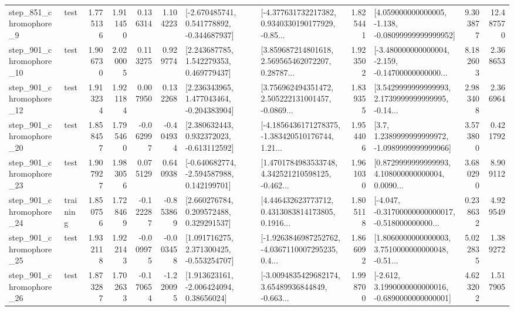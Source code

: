 \begin{tabular}{llrrrrllrlrr}
   step\_851\_chromophore\_9 &      test &      1.775136 &    1.911450 &      0.136314 &  1.104223 &   [-2.670485741, 0.541778892, -0.344687937] &  [-4.377631732217382, 0.9340330190177929, -0.85... &       1.825441 &  [4.059000000000005, -1.138, -0.08099999999999952] &            9.303877 &         12.487570 \\
  step\_901\_chromophore\_10 &      test &      1.906730 &    2.020005 &      0.113275 &  0.929774 &     [2.243687785, 1.542279353, 0.469779437] &  [3.859687214801618, 2.569565462072207, 0.28787... &       1.923502 &  [-3.480000000000004, -2.159, -0.14700000000000... &            8.182603 &          2.368653 \\
  step\_901\_chromophore\_12 &      test &      1.913234 &    1.921184 &      0.007950 &  0.132268 &    [2.236343965, 1.477043464, -0.204383904] &  [3.756962494351472, 2.505222131001457, -0.0869... &       1.839355 &  [3.5429999999999993, 2.1739999999999995, -0.14... &            2.983408 &          2.366964 \\
  step\_901\_chromophore\_20 &      test &      1.858457 &    1.795460 &     -0.062997 & -0.404934 &    [2.380632443, 0.932372023, -0.613112592] &  [-4.1856436171278375, -1.383420510176744, 1.21... &       1.954406 &     [3.7, 1.2389999999999972, -1.0989999999999966] &            3.573800 &          0.421792 \\
  step\_901\_chromophore\_23 &      test &      1.907927 &    1.983056 &      0.075129 &  0.640938 &   [-0.640682774, -2.594587988, 0.142199701] &  [1.4701784983533748, 4.342521210598125, -0.462... &       1.961030 &  [0.8729999999999993, 4.108000000000004, 0.0090... &            3.680290 &          8.909112 \\
  step\_901\_chromophore\_24 &  training &      1.850756 &    1.728469 &     -0.122287 & -0.853869 &     [2.660276784, 0.209572488, 0.329291537] &  [4.446432623773712, 0.4313083814173805, 0.1916... &       1.805118 &  [-4.047, -0.31700000000000017, -0.518000000000... &            0.238632 &          4.929549 \\
  step\_901\_chromophore\_25 &      test &      1.932118 &    1.922143 &     -0.009975 & -0.003458 &    [1.091716275, 2.371300425, -0.553254707] &  [-1.9263846987252762, -4.0367110007295235, 0.4... &       1.866092 &  [1.8060000000000003, 3.7510000000000048, -0.51... &            5.022835 &          1.389272 \\
  step\_901\_chromophore\_26 &      test &      1.873287 &    1.702633 &     -0.170654 & -1.220095 &     [1.913623161, -2.006424094, 0.38656024] &  [-3.0094835429682174, 3.65489936844849, -0.663... &       1.998700 &  [-2.612, 3.1990000000000016, -0.6890000000000001] &            4.623202 &          1.517905 \\

\end{tabular}
